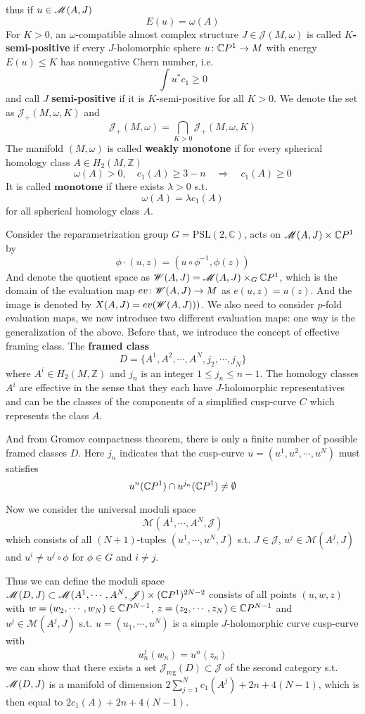 \documentclass[twoside]{article}
\begin{document}
thus if $u\in \mathscr{M}(A,J)$
\[E(u)=\omega(A)\]
For $K>0$, an $\omega$-compatible almost complex structure $J\in\mathscr{J}(M,\omega)$ 
is called \textbf{$K$-semi-positive} if every $J$-holomorphic sphere 
$u\colon \mathbb{C}P^{1}\rightarrow M$ with energy $E(u)\leq K$ has nonnegative Chern number, 
i.e. 
\[\int u^*c_1\geq0\]
and call $J$ \textbf{semi-positive} 
if it is $K$-semi-positive for all $K>0$. We denote the set as $\mathscr{J}_+(M,\omega,K)$ and 
\[\mathscr{J}_+(M,\omega)=\bigcap_{K>0}\mathscr{J}_+(M,\omega,K)\]
The manifold $(M,\omega)$ is called \textbf{weakly monotone} 
if for every spherical homology class $A\in H_2(M,\mathbb{Z})$
\[\omega(A)>0,\quad c_1(A)\geq 3-n \quad \Longrightarrow \quad c_1(A)\geq 0\]
It is called $\textbf{monotone}$ if there exists $\lambda>0$ s.t.
\[\omega(A)=\lambda c_1(A)\]
for all spherical homology class $A$.

Consider the reparametrization group $G=\textrm{PSL}(2,\mathbb{C})$, acts on $\mathscr{M}(A,J)\times \mathbb{C}P^{1}$ by
\[\phi \cdot(u,z)=(u\circ \phi^{-1},\phi(z)) \]
And denote the quotient space as $\mathscr{W}(A,J)=\mathscr{M}(A,J)\times_G \mathbb{C}P^{1}$, 
which is the domain of the evaluation map $ev\colon \mathscr{W}(A,J)\rightarrow M$ as $e(u,z)=u(z)$. 
And the image is denoted by $X(A,J)=ev(\mathscr{W}(A,J)))$.
We also need to consider $p$-fold evaluation maps, we now introduce two different evaluation maps: 
one way is the generalization of the above. 
Before that, we introduce the concept of effective framing class.
The \textbf{framed class}
\[D=\{A^1,A^2,\cdots,A^N,j_2,\cdots,j_N \}\]
where $A^i\in H_2(M,\mathbb{Z})$ and $j_n$ is an integer $1\leq j_n\leq n-1$. 
The homology classes $A^i$ are effective in the sense that 
they each have $J$-holomorphic representatives 
and can be the classes of the components of a simplified cusp-curve $C$ which represents the class $A$.

And from Gromov compactness theorem, 
there is only a finite number of possible framed classes $D$. 
Here $j_n$ indicates that the cusp-curve $u=(u^1,u^2,\cdots,u^N)$ must satisfies
\[u^n(\mathbb{C}P^{1})\cap u^{j_n}(\mathbb{C}P^{1})\neq \emptyset\]

Now we consider the universal moduli space
\[\mathscr{M}(A^1,\cdots,A^N,\mathscr{J})\]
which consists of all $(N+1)$-tuples $(u^1,\cdots,u^N,J)$ s.t. $J\in\mathscr{J}$, $u^j\in \mathscr{M}(A^j,J)$ 
and $u^i\neq u^j\circ \phi$ for $\phi\in G$ and $i\neq j$.

Thus we can define the moduli space 
$\mathscr{M}(D,J)\subset \mathscr{M}(A^1,\cdots,A^N,\mathscr{J})\times (\mathbb{C}P^{1})^{2N-2}$ 
consists of all points $(u,w,z)$ with $w=(w_2,\cdots,w_N)\in\mathbb{C}P^{N-1}$, 
$z=(z_2,\cdots,z_N)\in\mathbb{C}P^{N-1}$ and $u^j\in \mathscr{M}(A^j,J)$ s.t. 
$u=(u_1,\cdots,u^N)$ is a simple $J$-holomorphic curve cusp-curve with
\[u^j_n(w_n)=u^n(z_n)\]
we can show that there exists a set $\mathscr{J}_{\textrm{reg}}(D)\subset \mathscr{J}$ 
of the second category s.t. $\mathscr{M}(D,J)$ is a manifold of dimension $2\displaystyle \sum_{j=1}^{N}c_1(A^j)+2n+4(N-1)$, 
which is then equal to $2c_1(A)+2n+4(N-1)$.
\end{document}
